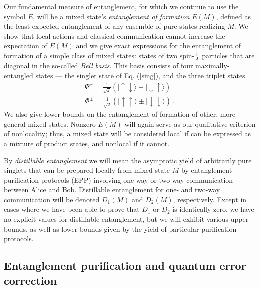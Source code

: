 Our fundamental measure of entanglement, for which we continue to use
the symbol $E$, will be a mixed state's {\em entanglement of
formation\/} $E(M)$, defined as the least expected entanglement of any
ensemble of pure states realizing $M$.  We show that local actions and
classical communication cannot increase the expectation of $E(M)$ and we
give exact expressions for the entanglement of formation of a simple
class of mixed states: states of two spin-$\mbox{$\textstyle \frac{1}{2}$}$ particles that are
diagonal in the so-called {\em Bell basis}.  This basis consists of four
maximally-entangled states --- the singlet state of Eq. (\ref{sing}),
and the three triplet states
 \begin{eqnarray}
\Psi^+=\frac{1}{\sqrt{2}}(|\!\uparrow\downarrow\rangle+
|\!\downarrow\uparrow\rangle)\ \label{bell1}\\
\Phi^\pm=\frac{1}{\sqrt{2}}
(|\!\uparrow\uparrow\rangle\pm |\!\downarrow\downarrow\rangle)\ .\label{bell2}
\end{eqnarray}
We also give lower bounds on the entanglement of formation of other,
more general mixed states. Nonzero $E(M)$ will again serve as our
qualitative criterion of nonlocality; thus, a mixed state will be
considered local if can be expressed as a mixture of product states,
and nonlocal if it cannot.
 
By {\em distillable entanglement\/} we will mean the asymptotic yield
of arbitrarily pure singlets that can be prepared locally from mixed state $M$
by entanglement purification protocols (EPP) involving one-way or
two-way communication between Alice and Bob.  Distillable entanglement
for one- and two-way communication will be denoted $D_1(M)$ and
$D_2(M)$, respectively.  Except in cases where we have been able to
prove that $D_1$ or $D_2$ is identically zero, we have no explicit
values for distillable entanglement, but we will exhibit various upper
bounds, as well as lower bounds given by the yield of particular
purification protocols.
 
 
\subsection{Entanglement purification and quantum error correction}
\label{subsec:epqec}
 
